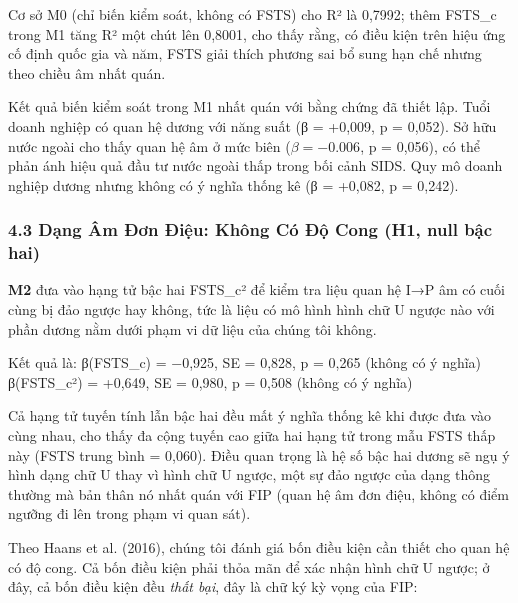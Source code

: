 \documentclass[12pt,a4paper]{article}
\begin{document}
Cơ sở M0 (chỉ biến kiểm soát, không có FSTS) cho R² là 0,7992; thêm
FSTS\_c trong M1 tăng R² một chút lên 0,8001, cho thấy rằng, có điều
kiện trên hiệu ứng cố định quốc gia và năm, FSTS giải thích phương sai
bổ sung hạn chế nhưng theo chiều âm nhất quán.

Kết quả biến kiểm soát trong M1 nhất quán với bằng chứng đã thiết lập.
Tuổi doanh nghiệp có quan hệ dương với năng suất (β = +0,009, p =
0,052). Sở hữu nước ngoài cho thấy quan hệ âm ở mức biên
(\(\beta = −0.006\), p = 0,056), có thể phản ánh hiệu quả đầu tư nước
ngoài thấp trong bối cảnh SIDS. Quy mô doanh nghiệp dương nhưng không có
ý nghĩa thống kê (β = +0,082, p = 0,242).

\hypertarget{43-dux1ea1ng-uxe2m-ux111ux1a1n-ux111iux1ec7u-khuxf4ng-cuxf3-ux111ux1ed9-cong-h1-null-bux1eadc-hai}{%
\subsubsection{4.3 Dạng Âm Đơn Điệu: Không Có Độ Cong (H1, null bậc
hai)}\label{43-dux1ea1ng-uxe2m-ux111ux1a1n-ux111iux1ec7u-khuxf4ng-cuxf3-ux111ux1ed9-cong-h1-null-bux1eadc-hai}}

\textbf{M2} đưa vào hạng tử bậc hai FSTS\_c² để kiểm tra liệu quan hệ
I→P âm có cuối cùng bị đảo ngược hay không, tức là liệu có mô hình hình
chữ U ngược nào với phần dương nằm dưới phạm vi dữ liệu của chúng tôi
không.

Kết quả là: β(FSTS\_c) = −0,925, SE = 0,828, p = 0,265 (không có ý
nghĩa) β(FSTS\_c²) = +0,649, SE = 0,980, p = 0,508 (không có ý nghĩa)

Cả hạng tử tuyến tính lẫn bậc hai đều mất ý nghĩa thống kê khi được đưa
vào cùng nhau, cho thấy đa cộng tuyến cao giữa hai hạng tử trong mẫu
FSTS thấp này (FSTS trung bình = 0,060). Điều quan trọng là hệ số bậc
hai dương sẽ ngụ ý hình dạng chữ U thay vì hình chữ U ngược, một sự đảo
ngược của dạng thông thường mà bản thân nó nhất quán với FIP (quan hệ âm
đơn điệu, không có điểm ngưỡng đi lên trong phạm vi quan sát).

Theo Haans et al. (2016), chúng tôi đánh giá bốn điều kiện cần thiết cho
quan hệ có độ cong. Cả bốn điều kiện phải thỏa mãn để xác nhận hình chữ
U ngược; ở đây, cả bốn điều kiện đều \emph{thất bại}, đây là chữ ký kỳ
vọng của FIP:
\end{document}
